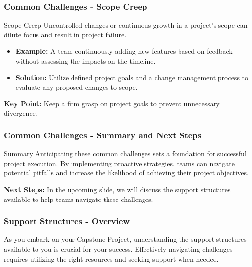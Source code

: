 \documentclass[aspectratio=169]{beamer}
\begin{document}
\begin{frame}[fragile]
  \frametitle{Common Challenges - Scope Creep}
  \begin{block}{Scope Creep}
    Uncontrolled changes or continuous growth in a project’s scope can dilute focus and result in project failure.
  \end{block}
  \begin{itemize}
    \item \textbf{Example:} A team continuously adding new features based on feedback without assessing the impacts on the timeline.
    \item \textbf{Solution:} Utilize defined project goals and a change management process to evaluate any proposed changes to scope.
  \end{itemize}
  \textbf{Key Point:} Keep a firm grasp on project goals to prevent unnecessary divergence.
\end{frame}

\begin{frame}[fragile]
  \frametitle{Common Challenges - Summary and Next Steps}
  \begin{block}{Summary}
    Anticipating these common challenges sets a foundation for successful project execution. By implementing proactive strategies, teams can navigate potential pitfalls and increase the likelihood of achieving their project objectives.
  \end{block}
  \textbf{Next Steps:} In the upcoming slide, we will discuss the support structures available to help teams navigate these challenges.
\end{frame}

\begin{frame}[fragile]
    \frametitle{Support Structures - Overview}
    As you embark on your Capstone Project, understanding the support structures available to you is crucial for your success. Effectively navigating challenges requires utilizing the right resources and seeking support when needed.
\end{frame}
\end{document}
